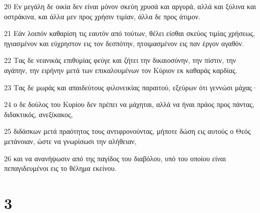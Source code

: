 \par 20 Εν μεγάλη δε οικία δεν είναι μόνον σκεύη χρυσά και αργυρά, αλλά και ξύλινα και οστράκινα, και άλλα μεν προς χρήσιν τιμίαν, άλλα δε προς άτιμον.
\par 21 Εάν λοιπόν καθαρίση τις εαυτόν από τούτων, θέλει είσθαι σκεύος τιμίας χρήσεως, ηγιασμένον και εύχρηστον εις τον δεσπότην, ητοιμασμένον εις παν έργον αγαθόν.
\par 22 Τας δε νεανικάς επιθυμίας φεύγε και ζήτει την δικαιοσύνην, την πίστιν, την αγάπην, την ειρήνην μετά των επικαλουμένων τον Κύριον εκ καθαράς καρδίας.
\par 23 Τας δε μωράς και απαιδεύτους φιλονεικίας παραιτού, εξεύρων ότι γεννώσι μάχας·
\par 24 ο δε δούλος του Κυρίου δεν πρέπει να μάχηται, αλλά να ήναι πράος προς πάντας, διδακτικός, ανεξίκακος,
\par 25 διδάσκων μετά πραότητος τους αντιφρονούντας, μήποτε δώση εις αυτούς ο Θεός μετάνοιαν, ώστε να γνωρίσωσι την αλήθειαν,
\par 26 και να ανανήψωσιν από της παγίδος του διαβόλου, υπό του οποίου είναι πεπαγιδευμένοι εις το θέλημα εκείνου.

\chapter{3}


